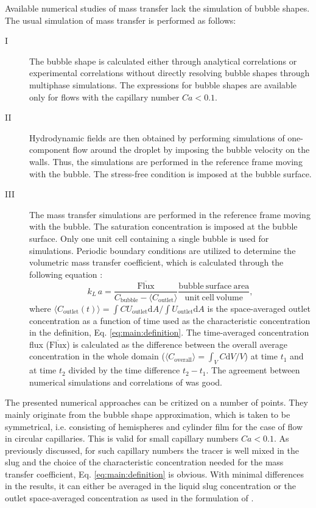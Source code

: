 \documentclass{article}
\newcommand{\vol}{k_L\,a}
\newcommand{\uoutlet}{U_{\mathrm{outlet}}}
\newcommand{\cbubble}{C_{\mathrm{bubble}}}
\newcommand{\coutlet}{C_{\mathrm{outlet}}}
\newcommand{\coverall}{C_{\mathrm{overall}}}
\begin{document}
Available numerical studies of mass transfer
\cite{kreutzer-overview,vanbaten-circular} lack the simulation of
bubble shapes. The usual simulation of mass transfer is performed as
follows: \begin{description}
 \item[I] The bubble shape is calculated either
through analytical correlations \cite{bretherton} or experimental correlations
\cite{cerro-bubble-train} without directly resolving bubble shapes through
multiphase simulations.  The expressions for bubble shapes are available only
for flows with the capillary number $Ca<0.1$.
  \item[II] Hydrodynamic fields
are then obtained by performing simulations of one-component flow around the
droplet by imposing the bubble velocity on the walls. Thus, the simulations are
performed in the reference frame moving with the bubble. The stress-free
condition is imposed at the bubble surface.
  \item[III]  The mass transfer
simulations are performed in the reference frame moving with the bubble. The
saturation concentration is imposed at the bubble surface. Only one unit cell
containing a single bubble is used for simulations. Periodic boundary conditions are
utilized to determine the volumetric mass transfer coefficient, which is
calculated through the following equation \cite{vanbaten-circular}:
\begin{equation} \label{main:simulation:equation}
\vol=\frac{\mathrm{\overline{Flux}}}{\cbubble-\langle\coutlet\rangle}
\frac{\mathrm{bubble\ surface\ area}}{\mathrm{unit\ cell\ volume}},
\end{equation}
 where $\langle\coutlet(t)\rangle=\int{C \uoutlet
\mathrm{d}A}/\int{\uoutlet\mathrm{d}A}$ is the space-averaged outlet
concentration as a function of time used as the characteristic concentration
in the definition, Eq. \ref{eq:main:definition}.  The time-averaged
concentration flux ($\mathrm{\overline{Flux}}$) is calculated as the difference
between the overall average concentration in the whole domain
($\langle\coverall\rangle=\int_{V} C \mathrm{d}V /V$) at time $t_1$ and at time
$t_2$ divided by the time difference $t_2-t_1$. The agreement between numerical
simulations \cite{vanbaten-circular} and correlations of \citet{bercic-mass}
was good.  \end{description}

The presented numerical approaches \cite{vanbaten-circular,kreutzer-overview}
can be critized on a number of points. They mainly
originate from the bubble shape approximation, which is taken to be symmetrical, i.e.
consisting of hemispheres and cylinder film for the case of flow in circular
capillaries. This is valid  for small capillary numbers $Ca<0.1$. As previously
discussed, for such capillary numbers the tracer is well mixed in the slug and 
the choice of the characteristic concentration needed for the mass transfer
coefficient, Eq. \ref{eq:main:definition} is obvious. With minimal
differences in the results, it can either be averaged in the liquid slug
concentration or the outlet space-averaged concentration as used in the formulation
of \citet{vanbaten-circular}. 
\end{document}
